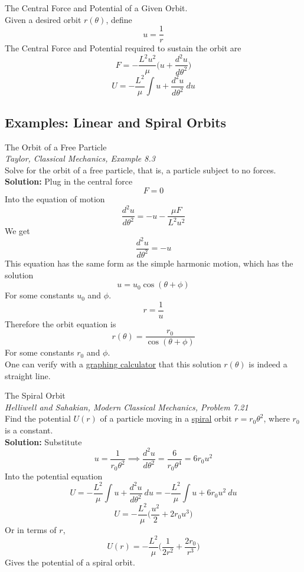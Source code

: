 \documentclass[11pt]{article}
\theoremstyle{gangnamstyle}{\newtheorem{definition}{Definition}[]}
\theoremstyle{gangnamstyle}{\newtheorem{example}{Example}[]}
\theoremstyle{gangnamstyle}{\newtheorem{problem}{Problem}[]}
\theoremstyle{gangnamstyle}{\newtheorem{warning}{Warning}[]}
\begin{document}
\begin{definition}
The Central Force and Potential of a Given Orbit. \\
Given a desired orbit $r(\theta)$, define
\begin{equation}
u = \frac{1}{r}
\end{equation}
The Central Force and Potential required to sustain the orbit are
\begin{equation}
F = -\frac{L^2u^2}{\mu} \Big(u + \frac{d^2u}{d\theta^2} \Big)
\end{equation}
\begin{equation}
U = - \frac{L^2}{\mu} \int u + \frac{d^2u}{d\theta^2} \ du
\end{equation}
\end{definition}

\subsection{Examples: Linear and Spiral Orbits}
\begin{example}
The Orbit of a Free Particle \\
\textit{Taylor, Classical Mechanics, Example 8.3} \\
Solve for the orbit of a free particle, that is, a particle subject to no forces. \\

\textbf{Solution:} Plug in the central force
\[ F = 0 \]
Into the equation of motion
\[ \frac{d^2u}{d\theta^2} = - u - \frac{\mu F}{L^2u^2} \]
We get
\[ \frac{d^2u}{d\theta^2} = - u \]
This equation has the same form as the simple harmonic motion, which has the solution
\[ u = u_0\cos(\theta + \phi) \]
For some constants $u_0$ and $\phi$. 
\[ r = \frac{1}{u} \]
Therefore the orbit equation is
\[ r(\theta) = \frac{r_0}{\cos(\theta + \phi)} \]
For some constants $r_0$ and $\phi$. \\
One can verify with a \href{https://www.desmos.com/calculator/go5msiu9nc}{graphing calculator} that this solution $r(\theta)$ is indeed a straight line. 
\end{example}

\begin{example}
The Spiral Orbit \\
\textit{Helliwell and Sahakian, Modern Classical Mechanics, Problem 7.21} \\
Find the potential $U(r)$ of a particle moving in a \href{https://www.desmos.com/calculator/dntfeetaj8}{spiral} orbit $r = r_0\theta^2$, where $r_0$ is a constant. \\

\textbf{Solution:} Substitute
\[ u = \frac{1}{r_0\theta^2} \implies \frac{d^2u}{d\theta^2} = \frac{6}{r_0\theta^4} = 6r_0u^2 \]
Into the potential equation
\[ U = - \frac{L^2}{\mu} \int u + \frac{d^2u}{d\theta^2} \ du = - \frac{L^2}{\mu} \int u + 6r_0u^2 \ du \]
\[ U = - \frac{L^2}{\mu} \Big( \frac{u^2}{2} + 2r_0u^3 \Big) \]
Or in terms of $r$, 
\[ U(r) = - \frac{L^2}{\mu} \Big( \frac{1}{2r^2} + \frac{2r_0}{r^3} \Big) \]
Gives the potential of a spiral orbit. 
\end{example}
\end{document}
